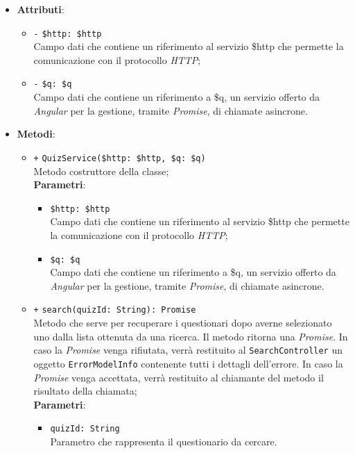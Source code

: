 \begin{itemize}
\begin{itemize}
	\end{itemize}
	\item \textbf{Attributi}:
	\begin{itemize}
		\item \texttt{-} \texttt{\$http: \$http} \\ Campo dati che contiene un riferimento al servizio \$http che permette la comunicazione con il protocollo \textit{HTTP};
		\item \texttt{-} \texttt{\$q: \$q} \\ Campo dati che contiene un riferimento a \$q, un servizio offerto da \textit{Angular} per la gestione, tramite \textit{Promise}, di chiamate asincrone.
	\end{itemize}
	\item \textbf{Metodi}: 
	\begin{itemize}
		\item \texttt{+} \texttt{QuizService(\$http: \$http, \$q: \$q)} \\ Metodo costruttore della classe; \\
		\textbf{Parametri}:
		\begin{itemize}
			\item \texttt{\$http: \$http} \\ Campo dati che contiene un riferimento al servizio \$http che permette la comunicazione con il protocollo \textit{HTTP};
			\item \texttt{\$q: \$q} \\ Campo dati che contiene un riferimento a \$q, un servizio offerto da \textit{Angular} per la gestione, tramite \textit{Promise}, di chiamate asincrone. 
		\end{itemize}
	\item \texttt{+} \texttt{search(quizId: String): Promise} \\Metodo che serve per recuperare i questionari dopo averne selezionato uno dalla lista ottenuta da una ricerca. Il metodo ritorna una \textit{Promise}. In caso la \textit{Promise} venga rifiutata, verrà restituito al \texttt{SearchController} un oggetto \texttt{ErrorModelInfo} contenente tutti i dettagli dell'errore. In caso la \textit{Promise} venga accettata, verrà restituito al chiamante del metodo il risultato della chiamata;\\
	\textbf{Parametri}:
	\begin{itemize}
		\item \texttt{quizId: String} \\ Parametro che rappresenta il questionario da cercare.

\end{itemize}
\end{itemize}
\end{itemize}
